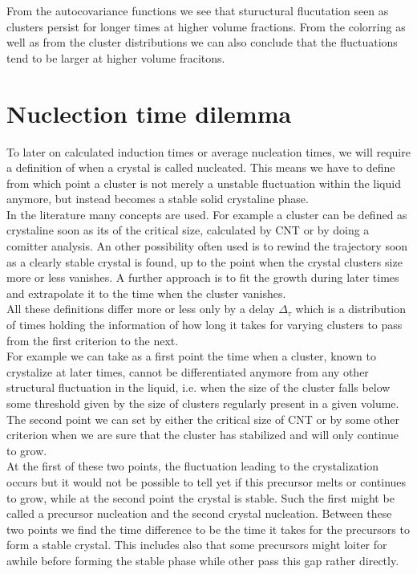 From the autocovariance functions we see that stuructural flucutation seen as clusters persist for longer times at higher volume fractions. From the colorring as well as from the cluster distributions we can also conclude that the fluctuations tend to be larger at higher volume fracitons.

\section{Nuclection time dilemma}
\label{sec:nucleation_times}

To later on calculated induction times or average nucleation times, we will require a definition of when a crystal is called nucleated. This means we have to define from which point a cluster is not merely a unstable fluctuation within the liquid anymore, but instead becomes a stable solid crystaline phase.\\ 
In the literature many concepts are used. For example a cluster can be defined as crystaline soon as its of the critical size, calculated by CNT or by doing a comitter analysis. An other possibility often used is to rewind the trajectory soon as a clearly stable crystal is found, up to the point when the crystal clusters size more or less vanishes. A further approach is to fit the growth during later times and extrapolate it to the time when the cluster vanishes.\\

All these definitions differ more or less only by a delay $\Delta_{\tau}$ which is a distribution of times holding the information of how long it takes for varying clusters to pass from the first criterion to the next.\\
For example we can take as a first point the time when a cluster, known to crystalize at later times, cannot be differentiated anymore from any other structural fluctuation in the liquid, i.e. when the size of the cluster falls below some threshold given by the size of clusters regularly present in a given volume.\\
The second point we can set by either the critical size of CNT or by some other criterion when we are sure that the cluster has stabilized and will only continue to grow.\\
At the first of these two points, the fluctuation leading to the crystalization occurs but it would not be possible to tell yet if this precursor melts or continues to grow, while at the second point the crystal is stable. Such the first might be called a precursor nucleation and the second crystal nucleation. Between these two points we find the time difference to be the time it takes for the precursors to form a stable crystal. This includes also that some precursors might loiter for awhile before forming the stable phase while other pass this gap rather directly.\\

